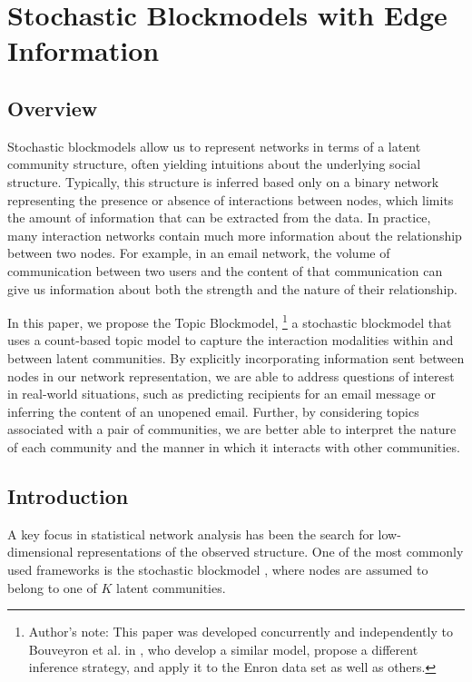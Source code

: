 \chapter{Stochastic Blockmodels with Edge Information}

\section{Overview}
    Stochastic blockmodels allow us to represent networks in terms of a latent community structure, often yielding intuitions about the underlying social structure. Typically, this structure is inferred based only on a binary network representing the presence or absence of interactions between nodes, which limits the amount of information that can be extracted from the data. In practice, many interaction networks contain much more information about the relationship between two nodes. For example, in an email network, the volume of communication between two users and the content of that communication can give us information about both the strength and the nature of their relationship.

    In this paper, we propose the Topic Blockmodel,
        \footnote{Author's note: This paper was developed concurrently and independently to Bouveyron et al. in \cite{bouveyron2018stochastic}, who develop a similar model, propose a different inference strategy, and apply it to the Enron data set as well as others.}
    a stochastic blockmodel that uses a count-based topic model to capture the interaction modalities within and between latent communities. By explicitly incorporating information sent between nodes in our network representation, we are able to address questions of interest in real-world situations, such as predicting recipients for an email message or inferring the content of an unopened email. Further, by considering topics associated with a pair of communities, we are better able to interpret the nature of each community and the manner in which it interacts with other communities.  
    
    

\section{Introduction}\label{sec:introduction}

    A key focus in statistical network analysis has been the search for low-dimensional representations of the observed structure. One of the most commonly used frameworks is the stochastic blockmodel \citep{Wang:Wong:1987,Snijders:Nowicki:1997}, where nodes are assumed to belong to one of $K$ latent communities. 
    
